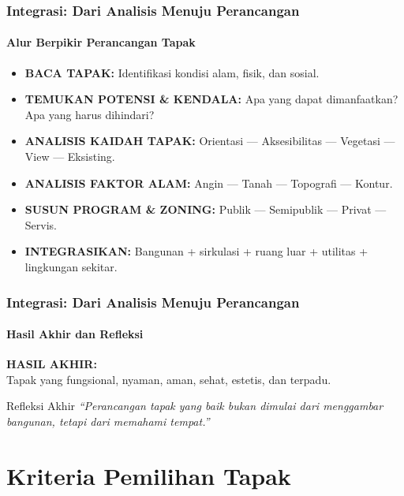 \documentclass[../main.tex]{subfiles}
\begin{document}
\begin{frame}[mytitle=center, t, mycolor=digiPH_white, light]
	\frametitle{Integrasi: Dari Analisis Menuju Perancangan}
	\framesubtitle{Alur Berpikir Perancangan Tapak}

	\begin{itemize}
		\item \textbf{BACA TAPAK:} Identifikasi kondisi alam, fisik, dan sosial.
		\item \textbf{TEMUKAN POTENSI \& KENDALA:} Apa yang dapat dimanfaatkan? Apa yang harus dihindari?
		\item \textbf{ANALISIS KAIDAH TAPAK:} Orientasi — Aksesibilitas — Vegetasi — View — Eksisting.
		\item \textbf{ANALISIS FAKTOR ALAM:} Angin — Tanah — Topografi — Kontur.
		\item \textbf{SUSUN PROGRAM \& ZONING:} Publik — Semipublik — Privat — Servis.
		\item \textbf{INTEGRASIKAN:} Bangunan + sirkulasi + ruang luar + utilitas + lingkungan sekitar.
	\end{itemize}
\end{frame}

\begin{frame}[mytitle=standard, c, mycolor=digiPH_cream, light]
	\frametitle{Integrasi: Dari Analisis Menuju Perancangan}
	\framesubtitle{Hasil Akhir dan Refleksi}

	\textbf{HASIL AKHIR:} \\
	Tapak yang fungsional, nyaman, aman, sehat, estetis, dan terpadu.

	\vspace{0.8cm}
	\begin{alertblock}{Refleksi Akhir}
		\centering
		\textit{“Perancangan tapak yang baik bukan dimulai dari menggambar bangunan, tetapi dari memahami tempat.”}
	\end{alertblock}
\end{frame}

\section{Kriteria Pemilihan Tapak}%
\label{sec:Kriteria Pemilihan Tapak}

\begin{frame}[mytitle=center,t,mycolor=digiPH_gray,light]


\end{frame}
\end{document}
